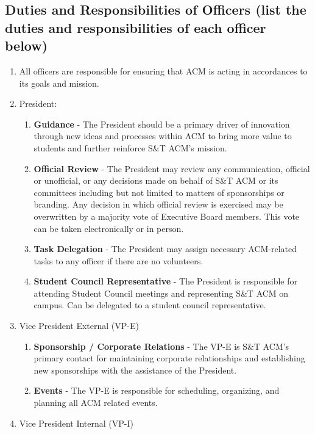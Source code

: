 \subsection{Duties and Responsibilities of Officers (list the duties and
responsibilities of each officer below)}
\begin{enumerate}[label=\arabic*.]
  \item All officers are responsible for ensuring that ACM is acting in
    accordances to its goals and mission.
  \item President:
    \begin{enumerate}[label=\alph*.]
      \item \textbf{Guidance} - The President should be a primary driver of
        innovation through new ideas and processes within ACM to bring more
        value to students and further reinforce S\&T ACM's mission.
      \item \textbf{Official Review} - The President may review any
        communication, official or unofficial, or any decisions made on behalf
        of S\&T ACM or its committees including but not limited to matters of
        sponsorships or branding. Any decision in which official review is
        exercised may be overwritten by a majority vote of Executive Board
        members. This vote can be taken electronically or in person.
      \item \textbf{Task Delegation} - The President may assign necessary
        ACM-related tasks to any officer if there are no volunteers.
      \item \textbf{Student Council Representative} - The President is
        responsible for attending Student Council meetings and representing S\&T
        ACM on campus. Can be delegated to a student council representative.
    \end{enumerate}
  \item Vice President External (VP-E)
    \begin{enumerate}[label=\alph*.]
      \item \textbf{Sponsorship / Corporate Relations} - The VP-E is S\&T ACM's
        primary contact for maintaining corporate relationships and
        establishing new sponsorships with the assistance of the President.
      \item \textbf{Events} - The VP-E is responsible for scheduling,
        organizing, and planning all ACM related events.
    \end{enumerate}
  \item Vice President Internal (VP-I)

\end{enumerate}
